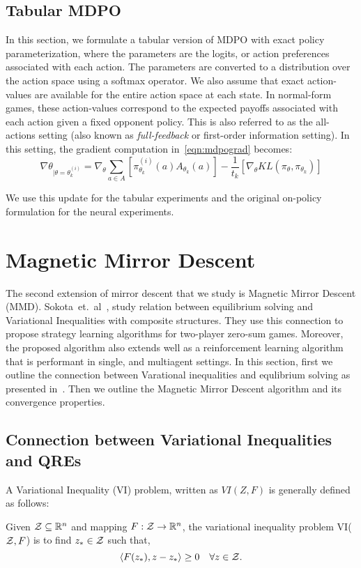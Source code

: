 \subsection{Tabular MDPO}
In this section, we formulate a tabular version of MDPO with exact policy parameterization, where
the parameters are the logits, or action preferences associated with each action.
The parameters are converted to a distribution over the action space using a softmax operator.
We also assume that exact action-values are available for the entire action space at each state.
In normal-form games, these action-values correspond to the expected payoffs associated with each
action given a fixed opponent policy.
This is also referred to as the all-actions setting (also known as \textit{full-feedback} or
first-order information setting).
In this setting, the gradient computation in~\ref{eqn:mdpograd} becomes: \[ \nabla
	\theta_{|\theta=\theta_{k}^{(i)}} = \nabla_{\theta} \sum_{a \in A} [ \pi_{\theta_k}^{(i)} (a)
		A_{\theta_k}(a)] - \frac{1}{t_k} [\nabla_\theta KL(\pi_\theta, \pi_{\theta_k})] \]

We use this update for the tabular experiments and the original on-policy
formulation for the neural experiments.

\section[MMD]{Magnetic Mirror Descent}
The second extension of mirror descent that we study is Magnetic Mirror Descent (MMD).
Sokota~et.~al~\cite{sokotaUnified2023}, study relation between equilibrium solving and Variational
Inequalities with composite structures.
They use this connection to propose strategy learning algorithms for two-player zero-sum games.
Moreover, the proposed algorithm also extends well as a reinforcement learning algorithm that is
performant in single, and multiagent settings.
In this section, first we outline the connection between Varational inequalities and equlibrium
solving as presented in~\cite{sokotaUnified2023}.
Then we outline the Magnetic Mirror Descent algorithm and its convergence properties.

\subsection{Connection between Variational Inequalities and QREs}
A Variational Inequality (VI) problem, written as $VI(Z, F)$ is generally defined as follows:
\begin{definition}
	\label{def:vi} Given $\mathcal{Z} \subseteq \mathbb{R}^n$ and mapping $F: \mathcal{Z} \rightarrow
		\mathbb{R}^n$, the variational inequality problem VI($\mathcal{Z}, F$) is to find $z_{\ast} \in \mathcal{Z}$ such that,
	\[ \langle F(z_{\ast}), z - z_{\ast} \rangle \geq 0 \quad \forall z \in \mathcal{Z}.
	\]
\end{definition}

